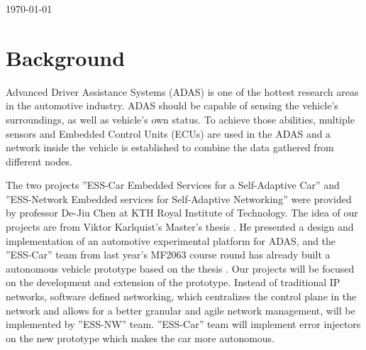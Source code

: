 \documentclass[11pt, titlepage]{article} %
\begin{document}
\begin{titlepage}
	
	
	\vfill\vfill\vfill %
	
	{\large\today} %
	
	
	 
	
	\vfill %
	
\end{titlepage}



\section*{Background}
Advanced Driver Assistance Systems (ADAS) is one of the hottest research
areas in the automotive industry. ADAS should be capable of sensing the
vehicle's surroundings, as well as vehicle's own status. To achieve those
abilities, multiple sensors and Embedded Control Units (ECUs) are used
in the ADAS and a network inside the vehicle is established to combine
the data gathered from different nodes.

The two projects ''ESS-Car Embedded Services for a Self-Adaptive Car'' and
''ESS-Network Embedded services for Self-Adaptive Networking'' were
provided by professor De-Jiu Chen at KTH Royal Institute of Technology.
The idea of our projects are from Viktor Karlquist's Master's thesis
\cite{viktor}. He presented a design and implementation of an automotive
experimental platform for ADAS, and the ''ESS-Car'' team from last year's
MF2063 course round has already built a autonomous vehicle prototype based
on the thesis \cite{old_ess}. Our projects will be focused on the
development and extension of the prototype. Instead of traditional IP
networks, software defined networking, which centralizes the control
plane in the network and allows for a better granular and agile network
management, will be implemented by ''ESS-NW'' team. ''ESS-Car'' team will
implement error injectors on the new prototype which makes the car more
autonomous.
\end{document}

